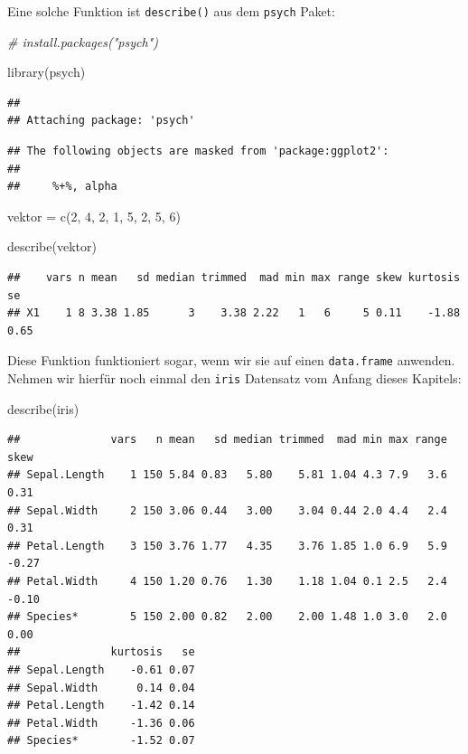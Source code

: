 \documentclass[
]{book}
\newenvironment{Shaded}{\begin{snugshade}}{\end{snugshade}}
\newcommand{\CommentTok}[1]{\textcolor[rgb]{0.56,0.35,0.01}{\textit{#1}}}
\newcommand{\DecValTok}[1]{\textcolor[rgb]{0.00,0.00,0.81}{#1}}
\newcommand{\FunctionTok}[1]{\textcolor[rgb]{0.00,0.00,0.00}{#1}}
\newcommand{\NormalTok}[1]{#1}
\newcommand{\OtherTok}[1]{\textcolor[rgb]{0.56,0.35,0.01}{#1}}
\begin{document}
Eine solche Funktion ist \texttt{describe()} aus dem \texttt{psych} Paket:

\begin{Shaded}
\begin{Highlighting}[]
\CommentTok{\# install.packages("psych")}

\FunctionTok{library}\NormalTok{(psych)}
\end{Highlighting}
\end{Shaded}

\begin{verbatim}
## 
## Attaching package: 'psych'
\end{verbatim}

\begin{verbatim}
## The following objects are masked from 'package:ggplot2':
## 
##     %+%, alpha
\end{verbatim}

\begin{Shaded}
\begin{Highlighting}[]
\NormalTok{vektor }\OtherTok{=} \FunctionTok{c}\NormalTok{(}\DecValTok{2}\NormalTok{, }\DecValTok{4}\NormalTok{, }\DecValTok{2}\NormalTok{, }\DecValTok{1}\NormalTok{, }\DecValTok{5}\NormalTok{, }\DecValTok{2}\NormalTok{, }\DecValTok{5}\NormalTok{, }\DecValTok{6}\NormalTok{)}

\FunctionTok{describe}\NormalTok{(vektor)}
\end{Highlighting}
\end{Shaded}

\begin{verbatim}
##    vars n mean   sd median trimmed  mad min max range skew kurtosis   se
## X1    1 8 3.38 1.85      3    3.38 2.22   1   6     5 0.11    -1.88 0.65
\end{verbatim}

Diese Funktion funktioniert sogar, wenn wir sie auf einen \texttt{data.frame} anwenden. Nehmen wir hierfür noch einmal den \texttt{iris} Datensatz vom Anfang dieses Kapitels:

\begin{Shaded}
\begin{Highlighting}[]
\FunctionTok{describe}\NormalTok{(iris)}
\end{Highlighting}
\end{Shaded}

\begin{verbatim}
##              vars   n mean   sd median trimmed  mad min max range  skew
## Sepal.Length    1 150 5.84 0.83   5.80    5.81 1.04 4.3 7.9   3.6  0.31
## Sepal.Width     2 150 3.06 0.44   3.00    3.04 0.44 2.0 4.4   2.4  0.31
## Petal.Length    3 150 3.76 1.77   4.35    3.76 1.85 1.0 6.9   5.9 -0.27
## Petal.Width     4 150 1.20 0.76   1.30    1.18 1.04 0.1 2.5   2.4 -0.10
## Species*        5 150 2.00 0.82   2.00    2.00 1.48 1.0 3.0   2.0  0.00
##              kurtosis   se
## Sepal.Length    -0.61 0.07
## Sepal.Width      0.14 0.04
## Petal.Length    -1.42 0.14
## Petal.Width     -1.36 0.06
## Species*        -1.52 0.07
\end{verbatim}
\end{document}
